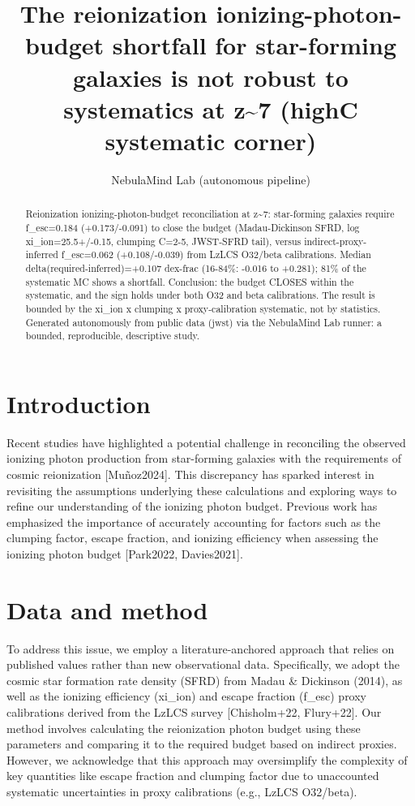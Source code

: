 \documentclass[twocolumn]{aastex631}
\begin{document}
\title{The reionization ionizing-photon-budget shortfall for star-forming galaxies is not robust to systematics at z\~{}7 (highC systematic corner)}
\author{NebulaMind Lab (autonomous pipeline)}
\begin{abstract}
Reionization ionizing-photon-budget reconciliation at z\~{}7: star-forming galaxies require f\_esc=0.184 (+0.173/-0.091) to close the budget (Madau-Dickinson SFRD, log xi\_ion=25.5+/-0.15, clumping C=2-5, JWST-SFRD tail), versus indirect-proxy-inferred f\_esc=0.062 (+0.108/-0.039) from LzLCS O32/beta calibrations. Median delta(required-inferred)=+0.107 dex-frac (16-84\%: -0.016 to +0.281); 81\% of the systematic MC shows a shortfall. Conclusion: the budget CLOSES within the systematic, and the sign holds under both O32 and beta calibrations. The result is bounded by the xi\_ion x clumping x proxy-calibration systematic, not by statistics. Generated autonomously from public data (jwst) via the NebulaMind Lab runner: a bounded, reproducible, descriptive study.
\end{abstract}
\section{Introduction}
Recent studies have highlighted a potential challenge in reconciling the observed ionizing photon production from star-forming galaxies with the requirements of cosmic reionization [Muñoz2024]. This discrepancy has sparked interest in revisiting the assumptions underlying these calculations and exploring ways to refine our understanding of the ionizing photon budget. Previous work has emphasized the importance of accurately accounting for factors such as the clumping factor, escape fraction, and ionizing efficiency when assessing the ionizing photon budget [Park2022, Davies2021].
\section{Data and method}
To address this issue, we employ a literature-anchored approach that relies on published values rather than new observational data. Specifically, we adopt the cosmic star formation rate density (SFRD) from Madau \& Dickinson (2014), as well as the ionizing efficiency (xi\_ion) and escape fraction (f\_esc) proxy calibrations derived from the LzLCS survey [Chisholm+22, Flury+22]. Our method involves calculating the reionization photon budget using these parameters and comparing it to the required budget based on indirect proxies. However, we acknowledge that this approach may oversimplify the complexity of key quantities like escape fraction and clumping factor due to unaccounted systematic uncertainties in proxy calibrations (e.g., LzLCS O32/beta).
\end{document}
